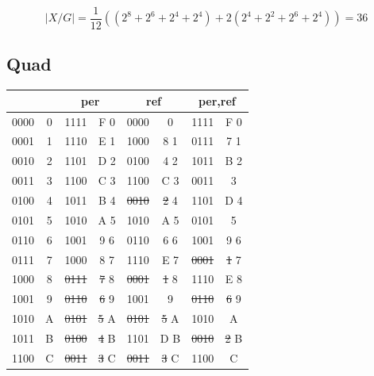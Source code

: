 \documentclass{ijuc}
\begin{document}
\[ |X/G| = \frac{1}{12} \left( (2^8 + 2^6 + 2^4 + 2^4) + 2 (2^4 + 2^2 + 2^6 + 2^4) \right) = 36 \]
\subsection{Quad}

\begin{table}
\begin{center}
\begin{tabular}{cc|cc|cc|cc}
\multicolumn{2}{c|}{} & \multicolumn{2}{c|}{per} & \multicolumn{2}{c|}{ref} & \multicolumn{2}{c}{per,ref} \\ \hline
0000 & 0              &       1111  &       F  0 &       0000  &       0     &       1111  &       F  0     \\
0001 & 1              &       1110  &       E  1 &       1000  &       8  1  &       0111  &       7  1     \\
0010 & 2              &       1101  &       D  2 &       0100  &       4  2  &       1011  &       B  2     \\
0011 & 3              &       1100  &       C  3 &       1100  &       C  3  &       0011  &       3        \\
0100 & 4              &       1011  &       B  4 & \sout{0010} & \sout{2} 4  &       1101  &       D  4     \\
0101 & 5              &       1010  &       A  5 &       1010  &       A  5  &       0101  &       5        \\
0110 & 6              &       1001  &       9  6 &       0110  &       6  6  &       1001  &       9  6     \\
0111 & 7              &       1000  &       8  7 &       1110  &       E  7  & \sout{0001} & \sout{1} 7     \\
1000 & 8              & \sout{0111} & \sout{7} 8 & \sout{0001} & \sout{1} 8  &       1110  &       E  8     \\
1001 & 9              & \sout{0110} & \sout{6} 9 &       1001  &       9     & \sout{0110} & \sout{6} 9     \\
1010 & A              & \sout{0101} & \sout{5} A & \sout{0101} & \sout{5} A  &       1010  &       A        \\
1011 & B              & \sout{0100} & \sout{4} B &       1101  &       D  B  & \sout{0010} & \sout{2} B     \\
1100 & C              & \sout{0011} & \sout{3} C & \sout{0011} & \sout{3} C  &       1100  &       C        \\

\end{tabular}
\end{center}
\end{table}
\end{document}
